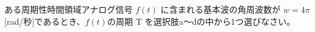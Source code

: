 ある周期性時間領域アナログ信号 $f(t)$ に含まれる基本波の角周波数が $w=4\pi$ [rad/秒]であるとき、$f(t)$の周期 $\textrm{T}$ を選択肢a〜dの中から1つ選びなさい。
